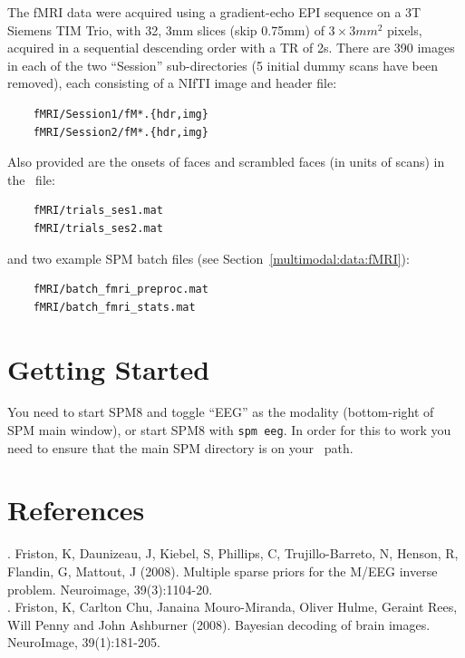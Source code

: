 The fMRI data were acquired using a gradient-echo EPI sequence on a 3T Siemens TIM Trio, with 32, 3mm slices (skip 0.75mm) of $3\times 3 mm^2$ pixels, acquired in a sequential descending order with a TR of 2s. There are 390 images in each of the two ``Session'' sub-directories (5 initial dummy scans have been removed), each consisting of a NIfTI image and header file:
\begin{verbatim}
    fMRI/Session1/fM*.{hdr,img}
    fMRI/Session2/fM*.{hdr,img}
\end{verbatim}
Also provided are the onsets of faces and scrambled faces (in units of scans) in the \matlab\ file:
\begin{verbatim}
    fMRI/trials_ses1.mat
    fMRI/trials_ses2.mat
\end{verbatim}
and two example SPM batch files (see Section~\ref{multimodal:data:fMRI}):
\begin{verbatim}
    fMRI/batch_fmri_preproc.mat
    fMRI/batch_fmri_stats.mat
\end{verbatim}


\section{Getting Started}

You need to start SPM8 and toggle ``EEG'' as the modality (bottom-right of SPM main window), or start SPM8 with \texttt{spm eeg}. In order for this to work you need to ensure that the main SPM directory is on your \matlab\ path.










\section{References}

. Friston, K, Daunizeau, J, Kiebel, S, Phillips, C, Trujillo-Barreto, N, Henson, R, Flandin, G, Mattout, J (2008). Multiple sparse priors for the M/EEG inverse problem. Neuroimage, 39(3):1104-20.\\

. Friston, K, Carlton Chu, Janaina Mouro-Miranda, Oliver Hulme, Geraint Rees, Will Penny and John Ashburner (2008). Bayesian decoding of brain images. NeuroImage, 39(1):181-205.\\

